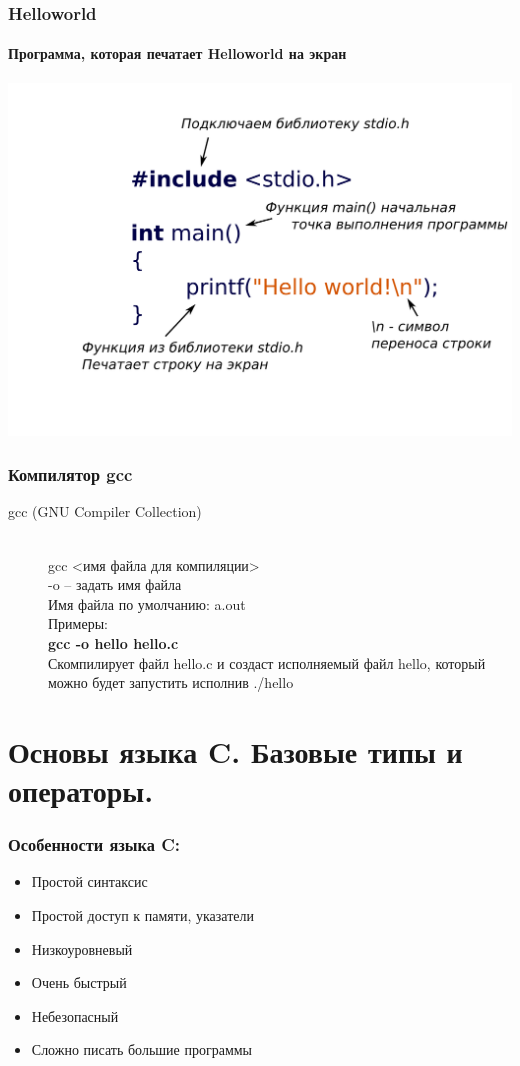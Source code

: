 \documentclass[12pt,pdf,hyperref={unicode}]{beamer}
\begin{document}
\begin{frame}[fragile]
\frametitle{Helloworld} 
\framesubtitle{Программа, которая печатает Helloworld на экран} 
\begin{center}
\includegraphics[width=0.99\linewidth]{images/hw5.png}
\end{center}
\end{frame}



\begin{frame}
\frametitle{Компилятор gcc}
\begin{description}
  \item[gcc (GNU Compiler Collection)] \hfill \\
  gcc <имя файла для компиляции>\\
  -o -- задать имя файла \\
  Имя файла по умолчанию: a.out \\
  Примеры: \\
  \quad  \textbf{gcc -o hello hello.c} \\
  Скомпилирует файл hello.c и создаст исполняемый файл hello, который можно будет запустить исполнив ./hello
\end{description}
\end{frame}


\section{Основы языка C. Базовые типы и операторы.}

\begin{frame}
\frametitle{Особенности языка C:} 
\begin{center}
\begin{itemize}
\item Простой синтаксис
\item Простой доступ к памяти, указатели
\item Низкоуровневый
\item Очень быстрый
\item Небезопасный
\item Сложно писать большие программы
\end{itemize}
\end{center}
\end{frame}
\end{document}
